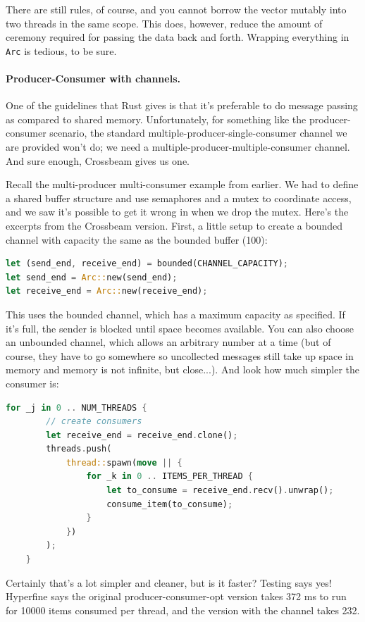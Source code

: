 \documentclass[a4paper]{report}
\begin{document}
\begin{appendices}
There are still rules, of course, and you cannot borrow the vector mutably into two threads in the same scope. This does, however, reduce the amount of ceremony required for passing the data back and forth. Wrapping everything in \texttt{Arc} is tedious, to be sure. 


\paragraph{Producer-Consumer with channels.} One of the guidelines that Rust gives is that it's preferable to do message passing as compared to shared memory. Unfortunately, for something like the producer-consumer scenario, the standard multiple-producer-single-consumer channel we are provided won't do; we need a multiple-producer-multiple-consumer channel. And sure enough, Crossbeam gives us one. 

Recall the multi-producer multi-consumer example from earlier. We had to define a shared buffer structure and use semaphores and a mutex to coordinate access, and we saw it's possible to get it wrong in when we drop the mutex. Here's the excerpts from the Crossbeam version. First, a little setup to create a bounded channel with capacity the same as the bounded buffer (100): 

\begin{lstlisting}[language=Rust]
let (send_end, receive_end) = bounded(CHANNEL_CAPACITY);
let send_end = Arc::new(send_end);
let receive_end = Arc::new(receive_end);
\end{lstlisting}

This uses the bounded channel, which has a maximum capacity as specified. If it's full, the sender is blocked until space becomes available. You can also choose an unbounded channel, which allows an arbitrary number at a time (but of course, they have to go somewhere so uncollected messages still take up space in memory and memory is not infinite, but close...).
And look how much simpler the consumer is:
\begin{lstlisting}[language=Rust]
    for _j in 0 .. NUM_THREADS {
        // create consumers
        let receive_end = receive_end.clone();
        threads.push(
            thread::spawn(move || {
                for _k in 0 .. ITEMS_PER_THREAD {
                    let to_consume = receive_end.recv().unwrap();
                    consume_item(to_consume);
                }
            })
        );
    }
\end{lstlisting}

Certainly that's a lot simpler and cleaner, but is it faster? Testing says yes! Hyperfine says the original producer-consumer-opt version takes 372 ms to run for 10000 items consumed per thread, and the version with the channel takes 232. 


\end{appendices}
\end{document}
